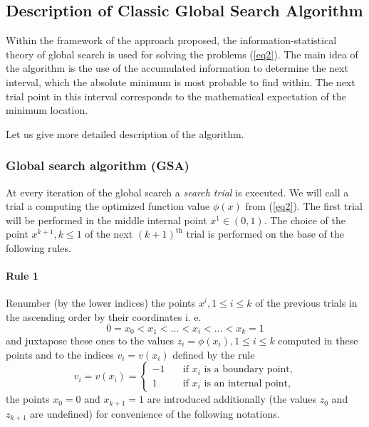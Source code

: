 \documentclass[runningheads]{llncs}
\begin{document}
\subsection{Description of Classic Global Search Algorithm}
Within the framework of the approach proposed, the information-statistical theory of global search is used for solving the problems (\ref{eq2}). The main idea of the algorithm is the use of the accumulated information to determine the next interval, which the absolute minimum is most probable to find within. The next trial point in this interval corresponds to the mathematical expectation of the minimum location.

Let us give more detailed description of the algorithm.

\subsubsection{Global search algorithm (GSA)} At every iteration of the global search a \textit{search trial} is executed. We will call a trial a computing the optimized function value  $\phi (x)$ from (\ref{eq2}). The first trial will be performed in the middle internal point $x^1 \in (0,1)$. The choice of the point $x^{k+1}, k \leq 1$ of the next $(k+1)^\text{th}$ trial is performed on the base of the following rules.

\paragraph{Rule 1} Renumber (by the lower indices) the points $x^i, 1 \leq i \leq k$  of the previous trials in the ascending order by their coordinates i. e.
\begin{equation}\label{eq5} 
0=x_0 < x_1 < ... < x_i < ... < x_k=1
\end{equation}
and juxtapose these ones to the values $z_i=\phi (x_i), 1 \leq i \leq k$ computed in these points and to the indices $v_i=v(x_i)$ defined by the rule
\begin{equation}\label{eq6} 
v_i=v(x_i)=
  \begin{cases}
    -1 & {\quad \text{if } x_i \text{ is a boundary point,}}\\
    1  & {\quad \text{if } x_i \text{ is an internal point,}}
  \end{cases}
\end{equation}
the points $x_0=0$ and $x_{k+1}=1$ are introduced additionally (the values $z_0$ and $z_{k+1}$ are undefined) for convenience of the following notations.
\end{document}
